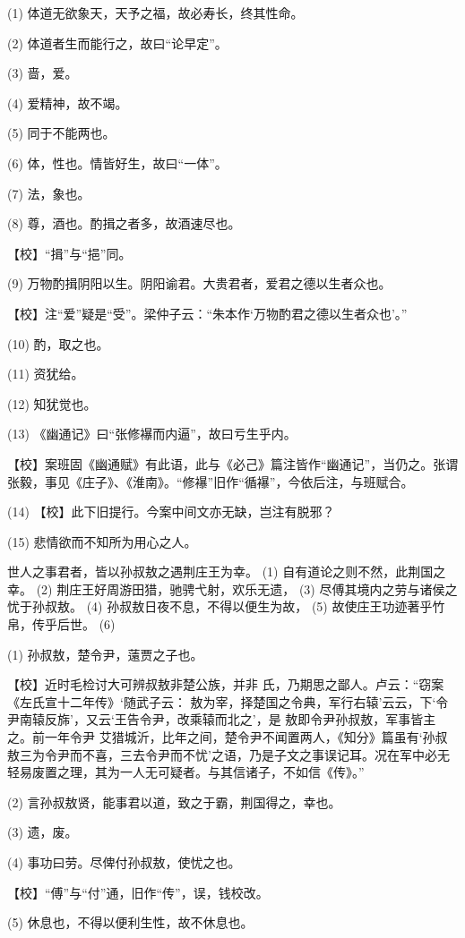\documentclass[12pt,UTF8]{ctexbook}
\begin{document}
(1) 体道无欲象天，天予之福，故必寿长，终其性命。

(2) 体道者生而能行之，故曰“论早定”。

(3) 啬，爱。

(4) 爱精神，故不竭。

(5) 同于不能两也。

(6) 体，性也。情皆好生，故曰“一体”。

(7) 法，象也。

(8) 尊，酒也。酌揖之者多，故酒速尽也。

【校】“揖”与“挹”同。

(9) 万物酌揖阴阳以生。阴阳谕君。大贵君者，爱君之德以生者众也。

【校】注“爱”疑是“受”。梁仲子云：“朱本作‘万物酌君之德以生者众也’。”

(10) 酌，取之也。

(11) 资犹给。

(12) 知犹觉也。

(13) 《幽通记》曰“张修襮而内逼”，故曰亏生乎内。

【校】案班固《幽通赋》有此语，此与《必己》篇注皆作“幽通记”，当仍之。张谓张毅，事见《庄子》、《淮南》。“修襮”旧作“循襮”，今依后注，与班赋合。

(14) 【校】此下旧提行。今案中间文亦无缺，岂注有脱邪？

(15) 悲情欲而不知所为用心之人。

世人之事君者，皆以孙叔敖之遇荆庄王为幸。 (1) 自有道论之则不然，此荆国之幸。 (2) 荆庄王好周游田猎，驰骋弋射，欢乐无遗， (3) 尽傅其境内之劳与诸侯之忧于孙叔敖。 (4) 孙叔敖日夜不息，不得以便生为故， (5) 故使庄王功迹著乎竹帛，传乎后世。 (6)

(1) 孙叔敖，楚令尹，薳贾之子也。

【校】近时毛检讨大可辨叔敖非楚公族，并非 氏，乃期思之鄙人。卢云：“窃案《左氏宣十二年传》‘随武子云： 敖为宰，择楚国之令典，军行右辕’云云，下‘令尹南辕反旆’，又云‘王告令尹，改乘辕而北之’，是 敖即令尹孙叔敖，军事皆主之。前一年令尹 艾猎城沂，比年之间，楚令尹不闻置两人，《知分》篇虽有‘孙叔敖三为令尹而不喜，三去令尹而不忧’之语，乃是子文之事误记耳。况在军中必无轻易废置之理，其为一人无可疑者。与其信诸子，不如信《传》。”

(2) 言孙叔敖贤，能事君以道，致之于霸，荆国得之，幸也。

(3) 遗，废。

(4) 事功曰劳。尽俾付孙叔敖，使忧之也。

【校】“傅”与“付”通，旧作“传”，误，钱校改。

(5) 休息也，不得以便利生性，故不休息也。
\end{document}
